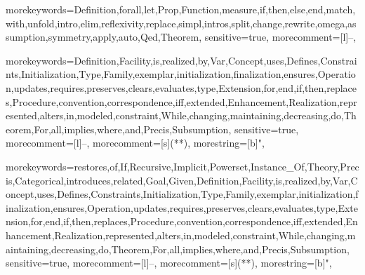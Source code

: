\usepackage{listings}
\usepackage{amsthm}
\usepackage{amsfonts}
\usepackage{amssymb}
\usepackage{amsmath}
\usepackage{caption}
\usepackage{subcaption}
\usepackage{mathrsfs}
\usepackage{booktabs}
\usepackage{placeins}

\setcounter{secnumdepth}{3}

\newtheorem{thm}{Theorem}


	{
		morekeywords={Definition,forall,let,Prop,Function,measure,if,then,else,end,match,with,unfold,intro,elim,reflexivity,replace,simpl,intros,split,change,rewrite,omega,assumption,symmetry,apply,auto,Qed,Theorem},
		sensitive=true,
		morecomment=[l]{--},
	}

	{
		morekeywords={Definition,Facility,is,realized,by,Var,Concept,uses,Defines,Constraints,Initialization,Type,Family,exemplar,initialization,finalization,ensures,Operation,updates,requires,preserves,clears,evaluates,type,Extension,for,end,if,then,replaces,Procedure,convention,correspondence,iff,extended,Enhancement,Realization,represented,alters,in,modeled,constraint,While,changing,maintaining,decreasing,do,Theorem,For,all,implies,where,and,Precis,Subsumption},
		sensitive=true,
		morecomment=[l]{--},
		morecomment=[s]{(*}{*)},
		morestring=[b]",
	}

	{
		morekeywords={restores,of,If,Recursive,Implicit,Powerset,Instance_Of,Theory,Precis,Categorical,introduces,related,Goal,Given,Definition,Facility,is,realized,by,Var,Concept,uses,Defines,Constraints,Initialization,Type,Family,exemplar,initialization,finalization,ensures,Operation,updates,requires,preserves,clears,evaluates,type,Extension,for,end,if,then,replaces,Procedure,convention,correspondence,iff,extended,Enhancement,Realization,represented,alters,in,modeled,constraint,While,changing,maintaining,decreasing,do,Theorem,For,all,implies,where,and,Precis,Subsumption},
		sensitive=true,
		morecomment=[l]{--},
		morecomment=[s]{(*}{*)},
		morestring=[b]",
	}
\lstset{language=resolve}

\usepackage{graphicx}

\newcommand{\cplusplus}{{\rm C\raise.5ex\hbox{\small ++}}}
